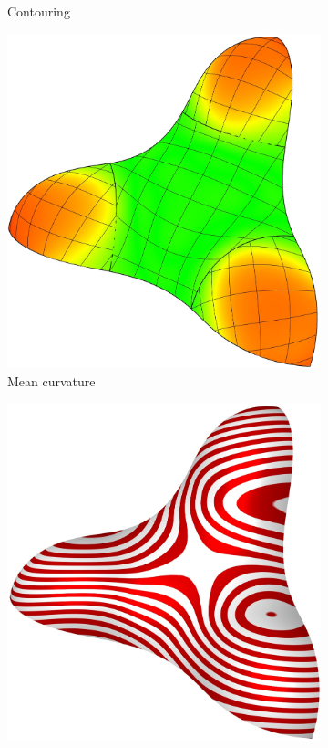 \documentclass{article}
\begin{document}
\begin{figure}[h!]
\begin{subfigure}{0.23\textwidth}
    \caption{Contouring}
  \end{subfigure}
  \begin{subfigure}{0.23\textwidth}
    \label{fig:trebol-mean}
    \includegraphics[width = \textwidth]{images/trebol3-mean-iso.jpg}
    \caption{Mean curvature}
  \end{subfigure}
  \begin{subfigure}{0.23\textwidth}
    \label{fig:trebol-iso}
    \includegraphics[width = \textwidth]{images/trebol3-zebra.jpg}

\end{subfigure}
\end{figure}
\end{document}
